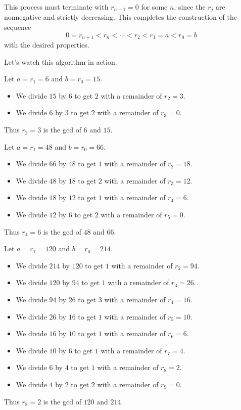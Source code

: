 \documentclass[11pt,dvipsnames]{book}
\numberwithin{equation}{section} %
\numberwithin{figure}{section} %
\numberwithin{table}{section} %
\begin{document}
This process must terminate with $r_{n+1}=0$ for some $n$, since the $r_{j}$ are nonnegative and strictly decreasing.
This completes the construction of the sequence
\[
0 = r_{n+1} < r_n < \cdots < r_2 < r_1 = a < r_0 = b
\]
with the desired properties.

Let's watch this algorithm in action.
\begin{example}
Let $a = r_1 = 6$ and $b = r_0 = 15$.
\begin{itemize}
    \item We divide $15$ by $6$ to get $2$ with a remainder of $r_2=3$.
    \item We divide $6$ by $3$ to get $2$ with a remainder of $r_3 = 0$.
\end{itemize}
Thus $r_2 = 3$ is the gcd of $6$ and $15$.
\end{example}

\begin{example}
Let $a = r_1 = 48$ and $b = r_0 = 66$.
\begin{itemize}
    \item We divide $66$ by $48$ to get $1$ with a remainder of $r_2=18$.
    \item We divide $48$ by $18$ to get $2$ with a remainder of $r_3 = 12$.
    \item We divide $18$ by $12$ to get $1$ with a remainder of $r_4 = 6$.
    \item We divide $12$ by $6$ to get $2$ with a remainder of $r_5 = 0$.
\end{itemize}
Thus $r_4 = 6$ is the gcd of $48$ and $66$.
\end{example}

\begin{example}
Let $a = r_1 = 120$ and $b = r_0 = 214$.
\begin{itemize}
    \item We divide $214$ by $120$ to get $1$ with a remainder of $r_2=94$.
    \item We divide $120$ by $94$ to get $1$ with a remainder of $r_3 = 26$.
    \item We divide $94$ by $26$ to get $3$ with a remainder of $r_4 = 16$.
    \item We divide $26$ by $16$ to get $1$ with a remainder of $r_5 = 10$.
    \item We divide $16$ by $10$ to get $1$ with a remainder of $r_6 = 6$.
    \item We divide $10$ by $6$ to get $1$ with a remainder of $r_7 = 4$.
    \item We divide $6$ by $4$ to get $1$ with a remainder of $r_8 = 2$.
    \item We divide $4$ by $2$ to get $2$ with a remainder of $r_9 = 0$.
\end{itemize}
Thus $r_8 = 2$ is the gcd of $120$ and $214$.
\end{example}
\end{document}
